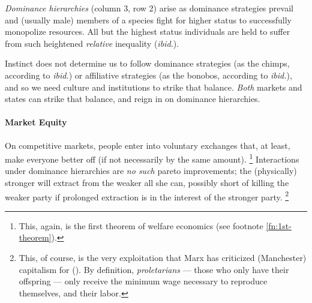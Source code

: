 

\emph{Dominance hierarchies} (column 3, row 2) arise as dominance strategies prevail and (usually male) members of a species fight for higher status to successfully monopolize resources.
 All but the highest status individuals are held to suffer from such heightened \emph{relative} inequality (\emph{ibid.}).

Instinct does not determine us to follow dominance strategies (as the chimps, according to \emph{ibid.}) or affiliative strategies (as the bonobos, according to \emph{ibid.}), and so we need culture and institutions to strike that balance.
\emph{Both} markets and states can strike that balance, and reign in on dominance hierarchies.

\paragraph{Market Equity}
	\label{sec:market-equity}
On competitive markets, people enter into voluntary exchanges that, at least, make everyone better off (if not necessarily by the same amount).
\footnote{
	This, again, is the first theorem of welfare economics (see footnote \ref{fn:1st-theorem}).
}
Interactions under dominance hierarchies are \emph{no such} pareto improvements;
the (physically) stronger will extract from the weaker all she can, possibly short of killing the weaker party if prolonged extraction is in the interest of the stronger party.
\footnote{
	This, of course, is the very exploitation that Marx has criticized (Manchester) capitalism for (\citeyear{MarxEngels-1848-aa,Marx-1867-aa}).
	By definition, \emph{proletarians} --- those who only have their offspring --- only receive the minimum wage necessary to reproduce themselves, and their labor.
}

